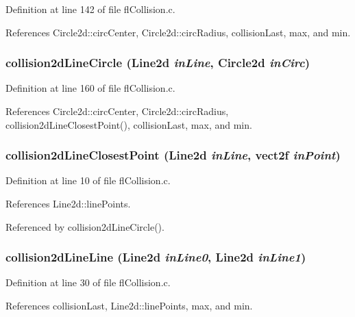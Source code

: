 Definition at line 142 of file fl\-Collision.c.

References Circle2d::circ\-Center, Circle2d::circ\-Radius, collision\-Last, max, and min.
\subsubsection{ collision2d\-Line\-Circle ({\bf Line2d} {\em in\-Line}, {\bf Circle2d} {\em in\-Circ})}\label{flCollision_8h_6aeb26d3a4760cd389a1fdd3a06ec498}




Definition at line 160 of file fl\-Collision.c.

References Circle2d::circ\-Center, Circle2d::circ\-Radius, collision2d\-Line\-Closest\-Point(), collision\-Last, max, and min.
\subsubsection{ collision2d\-Line\-Closest\-Point ({\bf Line2d} {\em in\-Line}, {\bf vect2f} {\em in\-Point})}\label{flCollision_8h_87cca69b4fc64de635bbd81da906c3ae}




Definition at line 10 of file fl\-Collision.c.

References Line2d::line\-Points.

Referenced by collision2d\-Line\-Circle().
\subsubsection{ collision2d\-Line\-Line ({\bf Line2d} {\em in\-Line0}, {\bf Line2d} {\em in\-Line1})}\label{flCollision_8h_0273e7aa05da48542d9a2dca76944955}




Definition at line 30 of file fl\-Collision.c.

References collision\-Last, Line2d::line\-Points, max, and min.

